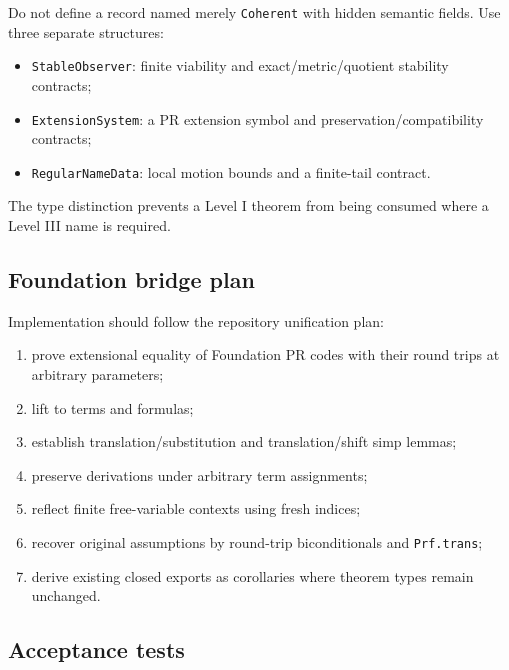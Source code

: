 Do not define a record named merely \texttt{Coherent} with hidden semantic fields.  Use three separate structures:
\begin{itemize}
  \item \texttt{StableObserver}: finite viability and exact/metric/quotient stability contracts;
  \item \texttt{ExtensionSystem}: a PR extension symbol and preservation/compatibility contracts;
  \item \texttt{RegularNameData}: local motion bounds and a finite-tail contract.
\end{itemize}
The type distinction prevents a Level I theorem from being consumed where a Level III name is required.

\subsection{Foundation bridge plan}

Implementation should follow the repository unification plan:
\begin{enumerate}
  \item prove extensional equality of Foundation PR codes with their round trips at arbitrary parameters;
  \item lift to terms and formulas;
  \item establish translation/substitution and translation/shift simp lemmas;
  \item preserve derivations under arbitrary term assignments;
  \item reflect finite free-variable contexts using fresh indices;
  \item recover original assumptions by round-trip biconditionals and \texttt{Prf.trans};
  \item derive existing closed exports as corollaries where theorem types remain unchanged.
\end{enumerate}

\subsection{Acceptance tests}

